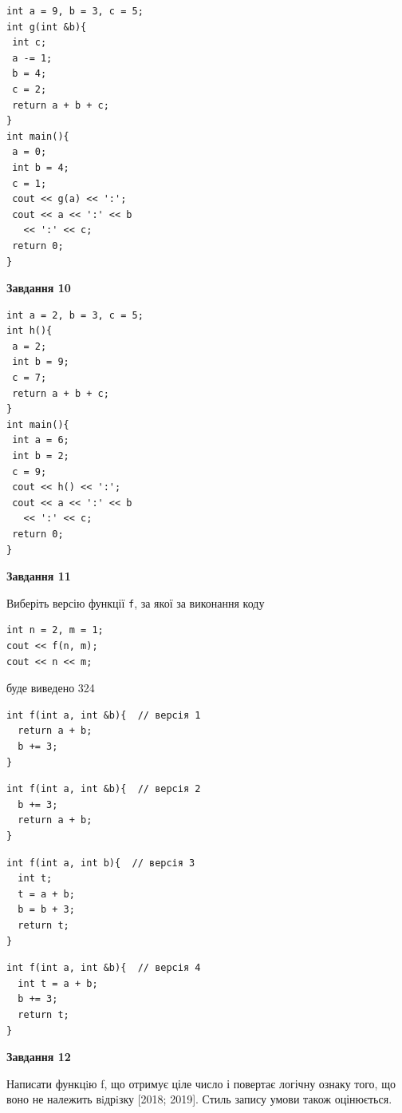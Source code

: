 \documentclass[12pt, ukrainian]{article}
\def\code#1{\Verb!#1!}
\begin{document}
{\begin {large}
\begin{minipage}[t]{7.0cm}
\begin{verbatim}
int a = 9, b = 3, c = 5;
int g(int &b){
 int c;
 a -= 1;
 b = 4;
 c = 2;
 return a + b + c;
}
int main(){
 a = 0;
 int b = 4;
 c = 1;
 cout << g(a) << ':';
 cout << a << ':' << b 
   << ':' << c;
 return 0;
}
\end{verbatim}



\begin{center}
\textbf{Завдання 10}
\end{center}
\vspace{-8mm}

\begin{verbatim}
int a = 2, b = 3, c = 5;
int h(){
 a = 2;
 int b = 9;
 c = 7;
 return a + b + c;
}
int main(){
 int a = 6;
 int b = 2;
 c = 9;
 cout << h() << ':';
 cout << a << ':' << b 
   << ':' << c;
 return 0;
}
\end{verbatim}

\end{minipage}
\vline \hspace{1mm}
\begin{minipage}[t]{11.0cm}

\begin{center}
\textbf{Завдання 11}
\end{center}
Виберіть версію функції \code{f}, за якої за виконання коду
\begin{verbatim}
int n = 2, m = 1;
cout << f(n, m);
cout << n << m;
\end{verbatim}

буде виведено 324

\begin{verbatim}
int f(int a, int &b){  // версія 1
  return a + b;
  b += 3;
}
\end{verbatim}

\vspace{-8mm}\begin{verbatim}
int f(int a, int &b){  // версія 2
  b += 3;
  return a + b;
}
\end{verbatim}

\vspace{-8mm}\begin{verbatim}
int f(int a, int b){  // версія 3
  int t;
  t = a + b;
  b = b + 3;
  return t;
}
\end{verbatim}

\vspace{-8mm}\begin{verbatim}
int f(int a, int &b){  // версія 4
  int t = a + b;
  b += 3;
  return t;
}
\end{verbatim}



\begin{center}
\textbf{Завдання 12}
\end{center}

Написати функцiю f, що отримує ціле число і повертає логічну ознаку того, що воно не належить вiдрiзку [2018; 2019]. Стиль запису умови також оцінюється.\par

\end{minipage}

\end {large}}
\end{document}
